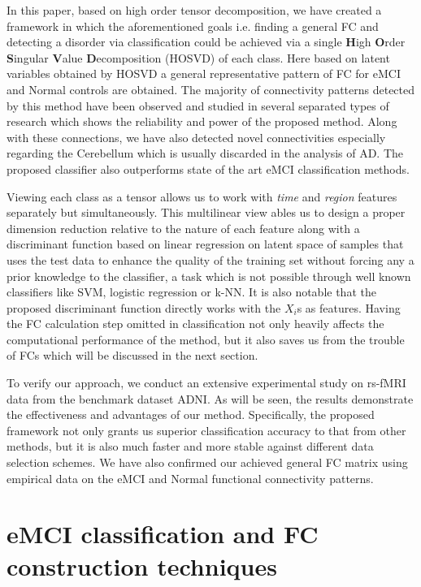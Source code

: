 \documentclass[journal]{IEEEtran}
\begin{document}
	
	In this paper, based on high order tensor decomposition, we have created a framework in which the aforementioned goals i.e. finding a general FC and detecting a disorder via classification could be achieved via a single \textbf{H}igh \textbf{O}rder \textbf{S}ingular \textbf{V}alue \textbf{D}ecomposition (HOSVD) of each class.
	Here based on latent variables obtained by HOSVD a general representative pattern of FC for eMCI and Normal controls are obtained. 
	The majority of connectivity patterns detected by this method have been observed and studied in several separated types of research which shows the reliability and power of the proposed method. Along with these connections, we have also detected novel connectivities especially regarding the Cerebellum which is usually discarded in the analysis of AD.     
	The proposed classifier also outperforms state of the art eMCI classification methods. 
	
	Viewing each class as a tensor allows us to work with \textit{time} and \textit{region} features separately but simultaneously. This multilinear view
	ables us to design a proper dimension reduction relative to the nature of each feature along with a discriminant function based on linear regression on latent space of samples that uses the test data to enhance the quality of the training set without forcing any a prior knowledge to the classifier, a task which is not possible through well known classifiers like SVM, logistic regression or k-NN. It is also notable that the proposed discriminant function directly works with the $X_i$s as features. Having the FC calculation step omitted in classification not only heavily affects the computational performance of the method, but it also saves us from the trouble of FCs which will be discussed in the next section.   
	
	To verify our approach, we conduct an extensive experimental study on rs-fMRI data from the
	benchmark dataset ADNI.
	As will be seen, the results demonstrate the effectiveness and advantages of our method. Specifically, the proposed framework not only grants us superior classification accuracy to that from other methods, but it is also much faster and more stable against different data selection schemes. We have also confirmed our achieved general FC matrix using empirical data on the eMCI and Normal functional connectivity patterns.
	
	
\section{eMCI classification and FC construction techniques}\label{related_works}
	
\end{document}
